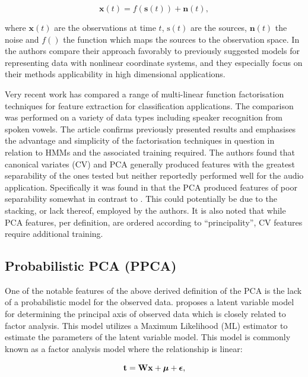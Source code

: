 \begin{equation}\label{eq:nonlinear}
\textbf{x}(t) = f\left(\textbf{s}(t)\right) + \textbf{n}\left(t\right),
\end{equation}

where $\textbf{x}(t)$ are the observations at time $t$, $\text{s}(t)$ are the sources, $\textbf{n}(t)$ the noise and $f()$ the function which maps the sources to the observation space. In \cite{Lappalainen2000} the authors compare their approach favorably to previously suggested models for representing data with nonlinear coordinate systems, and they especially focus on their methods applicability in high dimensional applications.

Very recent work has compared a range of multi-linear function factorisation techniques for feature extraction for classification applications\cite{Burke2013}. The comparison was performed on a variety of data types including speaker recognition from spoken vowels. The article confirms previously presented results and emphasises the advantage and simplicity of the factorisation techniques in question in relation to HMMs and the associated training required. The authors found that canonical variates (CV) and PCA generally produced features with the greatest separability of the ones tested but neither reportedly performed well for the audio application. Specifically it was found in \cite{Burke2013} that the PCA produced features of poor separability somewhat in contrast to \cite{Raychaudhuri2000}. This could potentially be due to the stacking, or lack thereof, employed by the authors. It is also noted that while PCA features, per definition, are ordered according to ``principality'', CV features require additional training\cite{Burke2013}.

\subsection{Probabilistic PCA (PPCA)}
One of the notable features of the above derived definition of the PCA is the lack of a probabilistic model for the observed data. \cite{Tipping1999} proposes a latent variable model for determining the principal axis of observed data which is closely related to factor analysis. This model utilizes a Maximum Likelihood (ML) estimator to estimate the parameters of the latent variable model. This model is commonly known as a factor analysis model where the relationship is linear:

\begin{equation}\label{eq:facAn}
\textrm{\textbf{t}} = \textrm{\textbf{W}}\textrm{\textbf{x}} + \boldsymbol\mu + \boldsymbol\epsilon,
\end{equation}

